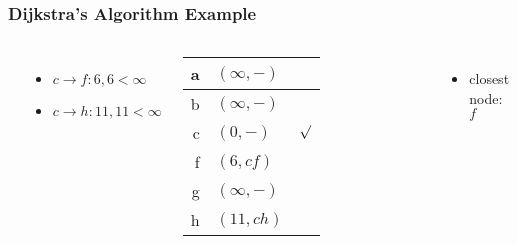 \documentclass[dvipsnames]{beamer}
\begin{document}
\begin{frame}
  \frametitle{Dijkstra's Algorithm Example}

  \begin{example}[from node $c$ - base distance=$0$]
    \begin{columns}
      \begin{center}
      \end{center}

      \begin{itemize}
        \item $c \rightarrow f: 6, 6 < \infty$
        \item $c \rightarrow h: 11, 11 < \infty$
      \end{itemize}

      \pause
      \begin{table}
        \begin{tabular}{r|l|c}
          a & $(\infty,-)$ & \\\hline
          b & $(\infty,-)$ & \\\hline
          c & $(0,-)$      & $\surd$ \\\hline
          f & $(6,cf)$     & \\\hline
          g & $(\infty,-)$ & \\\hline
          h & $(11,ch)$    &
        \end{tabular}
      \end{table}

      \pause
      \begin{itemize}
        \item closest node: $f$
      \end{itemize}
    \end{columns}
  \end{example}
\end{frame}
\end{document}
